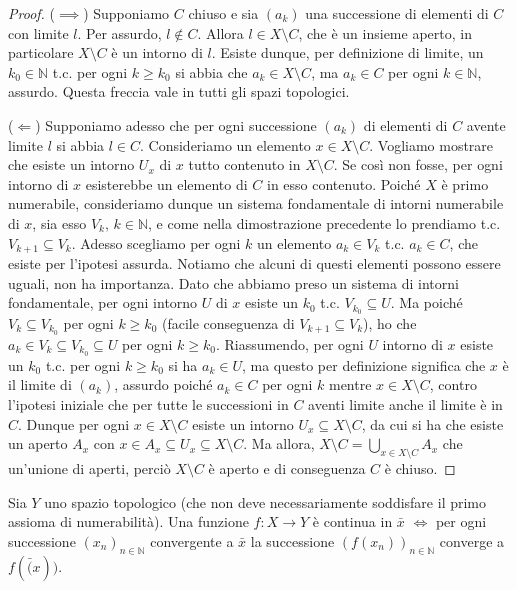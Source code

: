 \begin{proof}
	($\implies$) Supponiamo $C$ chiuso e sia $(a_k)$ una successione di elementi
	di $C$ con limite $l$. Per assurdo, $l \not\in C$. Allora $l \in X \setminus
	C$, che è un insieme aperto, in particolare $X \setminus C$ è un intorno di
	$l$. Esiste dunque, per definizione di limite, un $k_0 \in \mathbb{N}$ t.c.
	per ogni $k \ge k_0$ si abbia che $a_k \in X \setminus C$, ma $a_k \in C$
	per ogni $k \in \mathbb{N}$,
	assurdo. Questa freccia vale in tutti gli spazi topologici.

	($\Leftarrow$) Supponiamo adesso che per ogni successione $(a_k)$ di
	elementi di $C$ avente limite $l$ si abbia $l \in C$. Consideriamo un
	elemento $x \in X \setminus C$. Vogliamo mostrare che esiste un intorno
	$U_x$ di $x$ tutto contenuto in $X \setminus C$. Se così non fosse, per ogni
	intorno di $x$ esisterebbe un elemento di $C$ in esso contenuto. Poiché $X$
	è primo numerabile, consideriamo dunque un sistema fondamentale di intorni
	numerabile di $x$, sia esso $V_k, \, k \in \mathbb{N}$, e come nella
	dimostrazione precedente lo prendiamo t.c.
	$V_{k+1} \subseteq V_k$. Adesso scegliamo per ogni $k$ un elemento $a_k \in
	V_k$ t.c. $a_k \in C$, che esiste per l'ipotesi assurda. Notiamo che alcuni
	di questi elementi possono essere uguali, non ha importanza. Dato che
	abbiamo preso un sistema di intorni fondamentale, per ogni intorno $U$ di
	$x$ esiste un $k_0$ t.c. $V_{k_0} \subseteq U$. Ma poiché $V_k \subseteq V_
	{k_0}$ per ogni $k \ge k_0$ (facile conseguenza di $V_{k+1} \subseteq V_k$),
	ho che $a_k \in V_k \subseteq V_{k_0} \subseteq U$ per ogni $k \ge k_0$.
	Riassumendo, per ogni $U$ intorno di $x$ esiste un $k_0$ t.c. per ogni $k
	\ge k_0$ si ha $a_k \in U$, ma questo per definizione significa che $x$ è il
	limite di $(a_k)$, assurdo poiché $a_k \in C$ per ogni $k$ mentre $x \in X
	\setminus C$, contro l'ipotesi iniziale che per tutte le successioni in $C$
	aventi limite anche il limite è in $C$. Dunque per ogni $x \in X \setminus
	C$ esiste un intorno $U_x \subseteq X \setminus C$, da cui si ha che esiste
	un aperto $A_x$ con $x \in A_x \subseteq U_x \subseteq X \setminus C$. Ma
	allora, $\displaystyle X \setminus C=\bigcup_{x \in X \setminus C} A_x$ che
	un'unione di aperti, perciò $X \setminus C$ è aperto e di conseguenza $C$ è
	chiuso.
\end{proof}

\begin{prop}
	Sia $Y$ uno spazio topologico (che non deve necessariamente soddisfare il
	primo assioma di numerabilità). Una funzione $f:X \rightarrow Y$ è continua
	in $\bar{x}$ $\Leftrightarrow$ per ogni successione $(x_n)_{n \in
	\mathbb{N}}$ convergente a $\bar{x}$ la successione $(f(x_n))_{n \in
	\mathbb{N}}$ converge a $f(\bar(x))$.
\end{prop}

